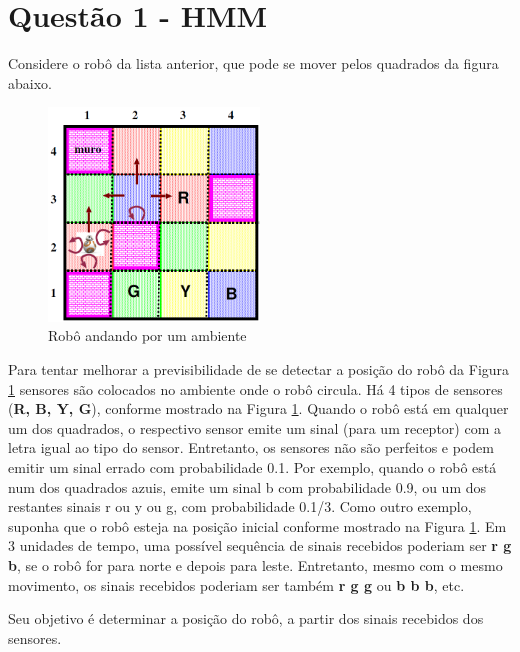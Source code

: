 \section*{Questão 1 - HMM}

Considere o robô da lista anterior, que pode se mover pelos quadrados da figura abaixo.

\begin{figure}[H]
    \centering
    \includegraphics[width=0.5\textwidth]{fig/enunciado_q1.png}
    \caption{Robô andando por um ambiente}
    \label{fig:q1}
\end{figure}   

Para tentar melhorar a previsibilidade de se detectar a posição do robô da Figura \ref{fig:q1} sensores são colocados no ambiente onde o robô circula. Há 4 tipos de sensores (\textbf{R, B, Y, G}), conforme mostrado na Figura \ref{fig:q1}. Quando o robô está em qualquer um dos quadrados, o respectivo sensor emite um sinal (para um receptor) com a letra igual ao tipo do sensor. Entretanto, os sensores não são perfeitos e podem emitir um sinal errado com probabilidade 0.1. Por exemplo, quando o robô está num dos quadrados azuis, emite um sinal b com probabilidade 0.9, ou um dos restantes sinais r ou y ou g, com probabilidade 0.1/3. Como outro exemplo, suponha que o robô esteja na posição inicial conforme mostrado na Figura \ref{fig:q1}. Em 3 unidades de tempo, uma possível sequência de sinais recebidos poderiam ser \textbf{r g b}, se o robô for para norte e depois para leste. Entretanto, mesmo com o mesmo movimento, os sinais recebidos poderiam ser também \textbf{r g g} ou \textbf{b b b}, etc.

Seu objetivo é determinar a posição do robô, a partir dos sinais recebidos dos sensores.

